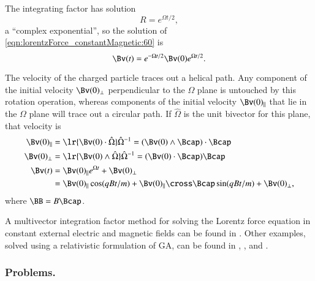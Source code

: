 The integrating factor has solution
\begin{dmath}\label{eqn:lorentzForce_constantMagnetic:180}
R = e^{\Omega t/2},
\end{dmath}
a ``complex exponential'', so the solution of \cref{eqn:lorentzForce_constantMagnetic:60} is
\begin{dmath}\label{eqn:lorentzForce_constantMagnetic:200}
\Bv(t) = e^{-\Omega t/2} \Bv(0) e^{\Omega t/2}.
\end{dmath}

The velocity of the charged particle traces out a helical path.
Any component of the initial velocity \( \Bv(0)_\perp \) perpendicular to the \( \Omega \) plane is untouched by this rotation operation, whereas components of the initial velocity \( \Bv(0)_\parallel \) that lie in the \( \Omega \) plane will trace out a circular path.
If \( \hat{\Omega} \) is the unit bivector for this plane, that velocity is
\begin{dmath}\label{eqn:lorentzForce_constantMagnetic:220}
\begin{aligned}
\Bv(0)_\parallel &= \lr{ \Bv(0) \cdot \hat{\Omega} } \hat{\Omega}^{-1}
                  = (\Bv(0) \wedge \Bcap) \cdot \Bcap \\
\Bv(0)_\perp &= \lr{ \Bv(0) \wedge \hat{\Omega} } \hat{\Omega}^{-1}
              = (\Bv(0) \cdot \Bcap) \Bcap \\
\Bv(t) &=
\Bv(0)_\parallel e^{\Omega t} + \Bv(0)_\perp \\
       &=
\Bv(0)_\parallel \cos( q B t/ m )
+
\Bv(0)_\parallel \cross \Bcap \sin( q B t/ m )
+ \Bv(0)_\perp,
\end{aligned}
\end{dmath}
where \( \BB = B \Bcap \).

A multivector integration factor method for solving the Lorentz force equation in constant external electric and magnetic fields can be found in \citep{hestenes1999nfc}.  Other examples, solved using a relativistic formulation of GA, can be found in \citep{doran2003gap},
\citep{hestenes1974properdynamics}, and
\citep{hestenes1974propermechanics}.

\subsubsection{Problems.}
